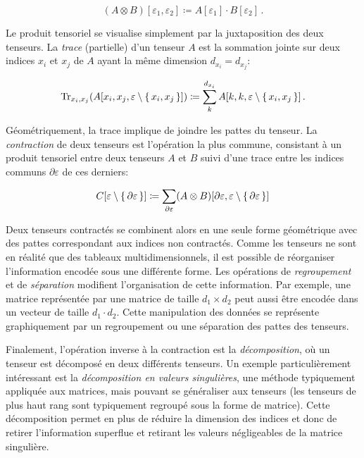 \begin{equation}
    (A \otimes B)[\varepsilon_{1}, \varepsilon_{2}] \coloneq A[\varepsilon_{1}] \cdot B[\varepsilon_{2}] \,.
\end{equation}

Le produit tensoriel se visualise simplement par la juxtaposition des deux tenseurs. La \textit{trace} (partielle) d'un tenseur $A$ est la sommation jointe sur deux indices $x_{i}$ et $x_{j}$ de $A$ ayant la même dimension $d_{x_{i}} = d_{x_{j}}$:

\begin{equation}
    \text{Tr}_{x_{i}, x_{j}} (A[x_{i}, x_{j}, \varepsilon \setminus \set{x_{i}, x_{j}}]) \coloneq \sum_{k}^{d_{x_{i}}} A[k, k, \varepsilon \setminus \set{x_{i}, x_{j}} ] \,. 
\end{equation}

Géométriquement, la trace implique de joindre les pattes du tenseur. La \textit{contraction} de deux tenseurs est l'opération la plus commune, consistant à un produit tensoriel entre deux tenseurs $A$ et $B$ suivi d'une trace entre les indices communs $\partial \varepsilon$ de ces derniers:

\begin{equation}
    C[\varepsilon \setminus \set{ \partial \varepsilon}] \coloneq  \sum_{\partial \varepsilon} (A \otimes B)[\partial \varepsilon,  \varepsilon \setminus \set{ \partial \varepsilon}]
\end{equation}

Deux tenseurs contractés se combinent alors en une seule forme géométrique avec des pattes correspondant aux indices non contractés. Comme les tenseurs ne sont en réalité que des tableaux multidimensionnels, il est possible de réorganiser l'information encodée sous une différente forme. Les opérations de \textit{regroupement} et de \textit{séparation} modifient l'organisation de cette information. Par exemple, une matrice représentée par une matrice de taille $d_{1} \times d_{2}$ peut aussi être encodée dans un vecteur de taille $d_{1} \cdot d_{2}$. Cette manipulation des données se représente graphiquement par un regroupement ou une séparation des pattes des tenseurs.

Finalement, l'opération inverse à la contraction est la \textit{décomposition}, où un tenseur est décomposé en deux différents tenseurs. Un exemple particulièrement intéressant est la \textit{décomposition en valeurs singulières}, une méthode typiquement appliquée aux matrices, mais pouvant se généraliser aux tenseurs (les tenseurs de plus haut rang sont typiquement regroupé sous la forme de matrice). Cette décomposition permet en plus de réduire la dimension des indices et donc de retirer l'information superflue et retirant les valeurs négligeables de la matrice singulière.

